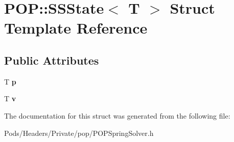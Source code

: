 \hypertarget{struct_p_o_p_1_1_s_s_state}{}\section{P\+OP\+:\+:S\+S\+State$<$ T $>$ Struct Template Reference}
\label{struct_p_o_p_1_1_s_s_state}
\subsection*{Public Attributes}
\begin{DoxyCompactItemize}
\item 
\mbox{\label{struct_p_o_p_1_1_s_s_state_a77924b777663fd88abeb724ffe3f99bd}} 
T {\bfseries p}
\item 
\mbox{\label{struct_p_o_p_1_1_s_s_state_ae158ab36dc1902bee7317aaa5a4cde1d}} 
T {\bfseries v}
\end{DoxyCompactItemize}


The documentation for this struct was generated from the following file\+:\begin{DoxyCompactItemize}
\item 
Pods/\+Headers/\+Private/pop/P\+O\+P\+Spring\+Solver.\+h\end{DoxyCompactItemize}
